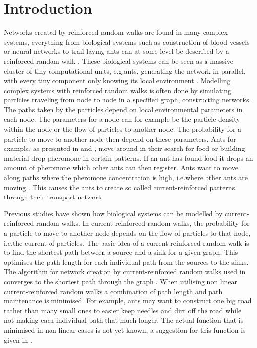 \section{Introduction}
\label{sec:introduction}
Networks created by reinforced random walks are found in many complex systems, everything from biological systems such as construction of blood vessels or neural networks to trail-laying ants can at some level be described by a reinforced random walk \cite{Edward, Schweitzer1997153}. These biological systems can be seen as a massive cluster of tiny computational units, e.g.\@ ants, generating the network in parallel, with every tiny component only knowing its local environment \cite{bonabeau1999swarm, Perna}. Modelling complex systems with reinforced random walks is often done by simulating particles traveling from node to node in a specified graph, constructing networks. The paths taken by the particles depend on local environmental parameters in each node. The parameters for a node can for example be the particle density within the node or the flow of particles to another node. The probability for a particle to move to another node then depend on these parameters. Ants for example, as presented in \cite{Schweitzer1997153} and \cite{Jackson}, move around in their search for food or building material drop pheromone in certain patterns. If an ant has found food it drops an amount of pheromone which other ants can then register. Ants want to move along paths where the pheromone concentration is high, i.e.\@ where other ants are moving \cite{Deneubourg}. This causes the ants to create so called current-reinforced patterns through their transport network.

Previous studies have shown how biological systems can be modelled by current-reinforced random walks. In current-reinforced random walks, the probability for a particle to move to another node depends on the flow of particles to that node, i.e.\@ the current of particles. The basic idea of a current-reinforced random walk is to find the shortest path between a source and a sink for a given graph. This optimises the path length for each individual path from the sources to the sinks. The algorithm for network creation by current-reinforced random walks used in \cite{Sumpter} converges to the shortest path through the graph \cite{Ito}. When utilising non linear current-reinforced random walks a combination of path length and path maintenance is minimised. For example, ants may want to construct one big road rather than many small ones to easier keep needles and dirt off the road while not making each individual path that much longer. The actual function that is minimised in non linear cases is not yet known, a suggestion for this function is given in \cite{Sumpter}.

